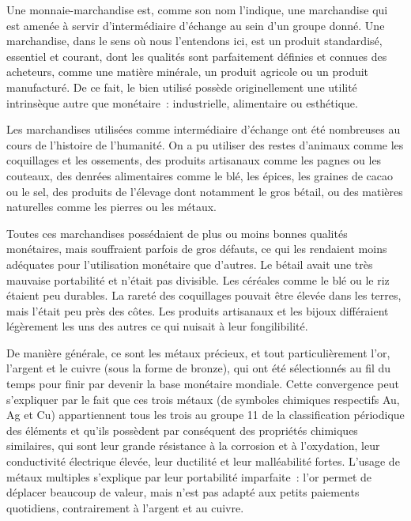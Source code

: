 
Une monnaie-marchandise est, comme son nom l'indique, une marchandise qui est amenée à servir d'intermédiaire d'échange au sein d'un groupe donné. Une marchandise, dans le sens où nous l'entendons ici, est un produit standardisé, essentiel et courant, dont les qualités sont parfaitement définies et connues des acheteurs, comme une matière minérale, un produit agricole ou un produit manufacturé. De ce fait, le bien utilisé possède originellement une utilité intrinsèque autre que monétaire~: industrielle, alimentaire ou esthétique.

Les marchandises utilisées comme intermédiaire d'échange ont été nombreuses au cours de l'histoire de l'humanité. On a pu utiliser des restes d'animaux comme les coquillages et les ossements, des produits artisanaux comme les pagnes ou les couteaux, des denrées alimentaires comme le blé, les épices, les graines de cacao ou le sel, des produits de l'élevage dont notamment le gros bétail, ou des matières naturelles comme les pierres ou les métaux.

Toutes ces marchandises possédaient de plus ou moins bonnes qualités monétaires, mais souffraient parfois de gros défauts, ce qui les rendaient moins adéquates pour l'utilisation monétaire que d'autres. Le bétail avait une très mauvaise portabilité et n'était pas divisible. Les céréales comme le blé ou le riz étaient peu durables. La rareté des coquillages pouvait être élevée dans les terres, mais l'était peu près des côtes. Les produits artisanaux et les bijoux différaient légèrement les uns des autres ce qui nuisait à leur fongilibilité.

De manière générale, ce sont les métaux précieux, et tout particulièrement l'or, l'argent et le cuivre (sous la forme de bronze), qui ont été sélectionnés au fil du temps pour finir par devenir la base monétaire mondiale. Cette convergence peut s'expliquer par le fait que ces trois métaux (de symboles chimiques respectifs Au, Ag et Cu) appartiennent tous les trois au groupe 11 de la classification périodique des éléments et qu'ils possèdent par conséquent des propriétés chimiques similaires, qui sont leur grande résistance à la corrosion et à l'oxydation, leur conductivité électrique élevée, leur ductilité et leur malléabilité fortes. L'usage de métaux multiples s'explique par leur portabilité imparfaite~: l'or permet de déplacer beaucoup de valeur, mais n'est pas adapté aux petits paiements quotidiens, contrairement à l'argent et au cuivre.

